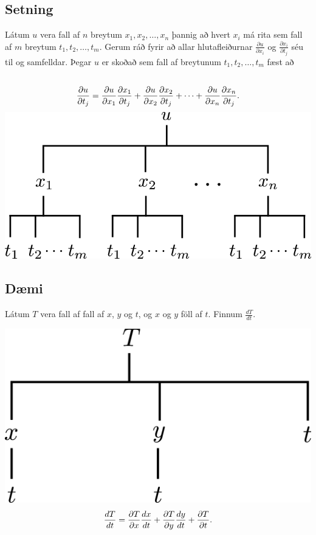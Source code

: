 \documentclass[a4paper,10pt,icelandic]{sphinxmanual}
\begin{document}
\subsection{Setning}
\label{Kafli2:id22}
Látum \(u\) vera fall af \(n\) breytum
\(x_1, x_2, \ldots, x_n\) þannig að hvert \(x_i\) má rita sem
fall af \(m\) breytum \(t_1, t_2, \ldots, t_m\). Gerum ráð fyrir
að allar hlutafleiðurnar \(\frac{\partial u}{\partial x_i}\) og
\(\frac{\partial x_i}{\partial t_j}\) séu til og samfelldar. Þegar
\(u\) er skoðað sem fall af breytunum \(t_1, t_2, \ldots, t_m\)
fæst að
\begin{gather}
\begin{split}\displaystyle\end{split}\notag\\\begin{split}\frac{\partial u}{\partial t_j}=
\frac{\partial u}{\partial x_1}\frac{\partial x_1}{\partial t_j}
+\frac{\partial u}{\partial x_2}\frac{\partial x_2}{\partial t_j}
+\cdots+
\frac{\partial u}{\partial x_n}\frac{\partial x_n}{\partial t_j}.\end{split}\notag
\end{gather}
{\hfill\includegraphics[width=0.500\linewidth]{chain3.png}\hfill}


\subsection{Dæmi}
\label{Kafli2:id23}
Látum \(T\) vera fall af fall af \(x\), \(y\) og \(t\),
og \(x\) og \(y\) föll af \(t\). Finnum
\(\frac{ dT}{dt}\).

{\hfill\includegraphics[width=0.400\linewidth]{chain5.png}\hfill}
\begin{gather}
\begin{split}\displaystyle \frac{d T}{d t} = \frac{\partial T}{\partial x} \frac{d x}{d t} +\frac{\partial T}{\partial y} \frac{d y}{d t} + \frac{\partial T}{\partial t} .\end{split}\notag
\end{gather}
\end{document}
